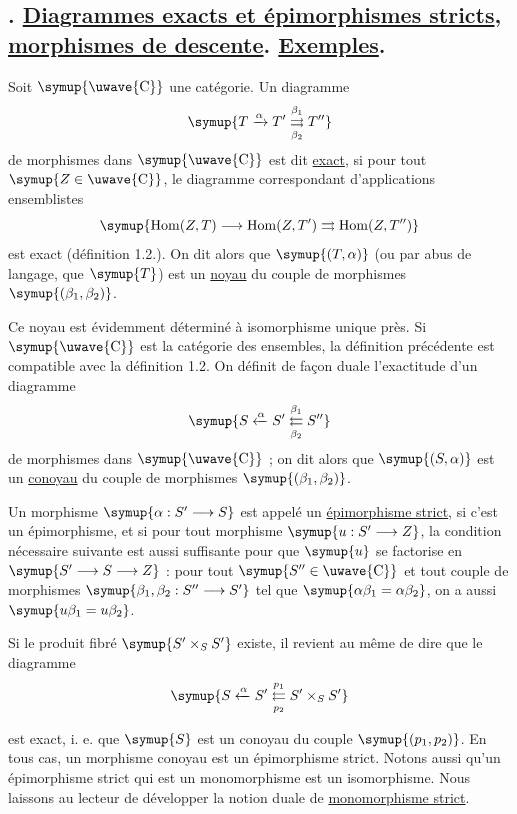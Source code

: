 \subsection*{. \uline{Diagrammes exacts et épimorphismes stricts}, \uline{morphismes de descente}. \uline{Exemples}.}

 Soit $\symup{\text{\uwave{C}}}$ une catégorie. Un diagramme
\[
  \symup{T\xrightarrow{\alpha}T'
  \overset{\beta_1}{\underset{\beta_2}{\rightrightarrows}}T''}
\]
de morphismes dans $\symup{\text{\uwave{C}}}$ est dit \uline{exact}, si pour tout
$\symup{Z\in\text{\uwave{C}}}$, le diagramme correspondant d'applications ensemblistes
\[
  \symup{\operatorname{Hom}(Z,T)\longrightarrow
  \operatorname{Hom}(Z,T')
  \rightrightarrows\operatorname{Hom}(Z,T'')}
\]
est exact (définition 1.2.). On dit alors que $\symup{(T,\alpha)}$ (ou par abus de
langage, que $\symup{T}$) est un \uline{noyau} du couple de morphismes
$\symup{(\beta_1,\beta_2)}$.

Ce noyau est évidemment déterminé à isomorphisme unique près. Si $\symup{\text{\uwave{C}}}$
est la catégorie des ensembles, la définition précédente est compatible avec
la définition 1.2. On définit de façon duale l'exactitude d'un diagramme
\[
  \symup{S\xleftarrow{\alpha}S'
  \overset{\beta_1}{\underset{\beta_2}{\leftleftarrows}}S''}
\]
de morphismes dans $\symup{\text{\uwave{C}}}$ ; on dit alors que $\symup{(S,\alpha)}$ est un
\uline{conoyau} du couple de morphismes $\symup{(\beta_1,\beta_2)}$.

 Un morphisme $\symup{\alpha:S'\longrightarrow S}$ est appelé
un \uline{épimorphisme strict}, si c'est un épimorphisme, et si pour tout
morphisme $\symup{u:S'\longrightarrow Z}$, la condition nécessaire suivante est aussi
suffisante pour que $\symup{u}$ se factorise en $\symup{S'\longrightarrow S\longrightarrow Z}$ :
pour tout $\symup{S''\in\text{\uwave{C}}}$ et tout couple de morphismes
$\symup{\beta_1,\beta_2:S''\longrightarrow S'}$ tel que
$\symup{\alpha\beta_1=\alpha\beta_2}$, on a aussi $\symup{u\beta_1=u\beta_2}$.

Si le produit fibré $\symup{S'\times_S S'}$ existe, il revient au même de dire que le
diagramme
\[
  \symup{S\xleftarrow{\alpha}S'
  \overset{p_1}{\underset{p_2}{\leftleftarrows}}S'\times_S S'}
\]

est exact, i. e. que $\symup{S}$ est un conoyau du couple $\symup{(p_1,p_2)}$. En tous cas, un
morphisme conoyau est un épimorphisme strict. Notons aussi qu'un épimorphisme
strict qui est un monomorphisme est un isomorphisme. Nous laissons au lecteur
de développer la notion duale de \uline{monomorphisme strict}.

